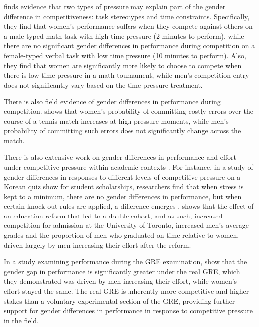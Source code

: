 \documentclass[a4paper, nobind]{templates/ociamthesis}
\begin{document}
\textcite{Shurchkov2012} finds evidence that two types of pressure may explain part of the gender difference in competitiveness: task stereotypes and time constraints. Specifically, they find that women's performance suffers when they compete against others on a male-typed math task with high time pressure (2 minutes to perform), while there are no significant gender differences in performance during competition on a female-typed verbal task with low time pressure (10 minutes to perform). Also, they find that women are significantly more likely to choose to compete when there is low time pressure in a math tournament, while men's competition entry does not significantly vary based on the time pressure treatment.

There is also field evidence of gender differences in performance during competition. \textcite{Paserman2007} shows that women's probability of committing costly errors over the course of a tennis match increases at high-pressure moments, while men's probability of committing such errors does not significantly change across the match.

There is also extensive work on gender differences in performance and effort under competitive pressure within academic contexts \autocites{Iriberri2019,Cai2019,Ors2013,Azmat2016,Price2008}[see][ for a review on gender differences in math tests scores]{Niederle2010c}. For instance, in a study of gender differences in responses to different levels of competitive pressure on a Korean quiz show for student scholarships, researchers find that when stress is kept to a minimum, there are no gender differences in performance, but when certain knock-out rules are applied, a difference emerges \autocite{Booth2021}. \textcite{Morin2015} shows that the effect of an education reform that led to a double-cohort, and as such, increased competition for admission at the University of Toronto, increased men's average grades and the proportion of men who graduated on time relative to women, driven largely by men increasing their effort after the reform.

In a study examining performance during the GRE examination, \textcite{Attali2012} show that the gender gap in performance is significantly greater under the real GRE, which they demonstrated was driven by men increasing their effort, while women's effort stayed the same. The real GRE is inherently more competitive and higher-stakes than a voluntary experimental section of the GRE, providing further support for gender differences in performance in response to competitive pressure in the field.
\end{document}
